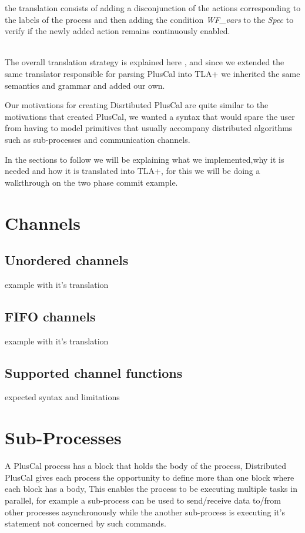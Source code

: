 \documentclass{thesul}
\begin{document}
the translation consists of adding a disconjunction of the actions corresponding to the labels of the process and then adding the condition \textit{WF\_vars} to the \textit{Spec} to verify if the newly added action remains continuously enabled.

\hfill\\
The overall translation strategy is explained here \cite{pcalAlgo}, and since we extended the same translator responsible for parsing PlusCal into TLA+ we inherited the same semantics and grammar and added our own.

Our motivations for creating Disrtibuted PlusCal are quite similar to the motivations that created PlusCal, we wanted a syntax that would spare the user from having to model primitives that usually accompany distributed algorithms such as sub-processes and communication channels.


In the sections to follow we will be explaining what we implemented,why it is needed and how it is translated into TLA+, for this we will be doing a walkthrough on the two phase commit example. 

\section{Channels}
\subsection{Unordered channels}
example with it's translation
\subsection{FIFO channels}
example with it's translation
\subsection{Supported channel functions}
expected syntax and limitations

\section{Sub-Processes}

A PlusCal process has a block that holds the body of the process, Distributed PlusCal gives each process the opportunity to define more than one block where each block has a body, This enables the process to be executing multiple tasks in parallel, for example a sub-process can be used to send/receive data to/from other processes asynchronously while the another sub-process is executing it's statement not concerned by such commands.
\end{document}
